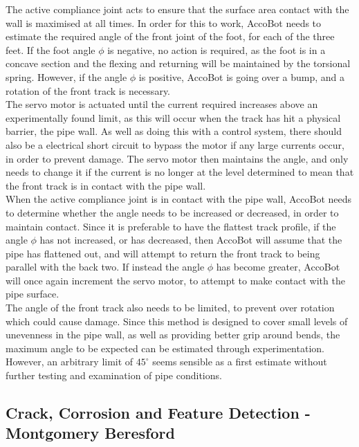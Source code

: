 \documentclass[11pt]{article}		%
\begin{document}
			The active compliance joint acts to ensure that the surface area contact with the wall is maximised at all times.
			In order for this to work, AccoBot needs to estimate the required angle of the front joint of the foot, for each of the three feet.
			If the foot angle $\phi$ is negative, no action is required, as the foot is in a concave section and the flexing and returning will be maintained by the torsional spring.
			However, if the angle $\phi$ is positive, AccoBot is going over a bump, and a rotation of the front track is necessary.
			\\
			The servo motor is actuated until the current required increases above an experimentally found limit, as this will occur when the track has hit a physical barrier, the pipe wall.
			As well as doing this with a control system, there should also be a electrical short circuit to bypass the motor if any large currents occur, in order to prevent damage.
			The servo motor then maintains the angle, and only needs to change it if the current is no longer at the level determined to mean that the front track is in contact with the pipe wall.
			\\
			When the active compliance joint is in contact with the pipe wall, AccoBot needs to determine whether the angle needs to be increased or decreased, in order to maintain contact.
			Since it is preferable to have the flattest track profile, if the angle $\phi$ has not increased, or has decreased, then AccoBot will assume that the pipe has flattened out, and will attempt to return the front track to being parallel with the back two.
			If instead the angle $\phi$ has become greater, AccoBot will once again increment the servo motor, to attempt to make contact with the pipe surface.
			\\
			The angle of the front track also needs to be limited, to prevent over rotation which could cause damage.
			Since this method is designed to cover small levels of unevenness in the pipe wall, as well as providing better grip around bends, the maximum angle to be expected can be estimated through experimentation.
			However, an arbitrary limit of $45^\circ$ seems sensible as a first estimate without further testing and examination of pipe conditions.
				
		\subsection[Crack, Corrosion and Feature Detection]{Crack, Corrosion and Feature Detection - Montgomery Beresford} \label{featureDetection}
		
\end{document}
